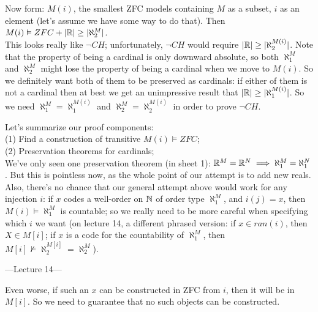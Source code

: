 \documentclass[a4paper]{article}
\begin{document}
Now form: $M(i)$, the smallest ZFC models containing $M$ as a subset, $i$ as an element (let's assume we have some way to do that). Then $M(i) \vDash ZFC+|\mathbb{R}| \geq |\aleph_2^M|$.\\
This looks really like $\neg CH$; unfortunately, $\neg CH$ would require $|\mathbb{R}| \geq |\aleph_2^{M(i)}|$. Note that the property of being a cardinal is only downward absolute, so both $\aleph_1^M$ and $\aleph_2^M$ might lose the property of being a cardinal when we move to $M(i)$. So we definitely want both of them to be preserved as cardinals: if either of them is not a cardinal then at best we get an unimpressive result that $|\mathbb{R}| \geq |\aleph_1^{M(i)}|$. So we need $\aleph_1^M = \aleph_1^{M(i)}$ and $\aleph_2^M = \aleph_2^{M(i)}$ in order to prove $\neg CH$.

Let's summarize our proof components:\\
(1) Find a construction of transitive $M(i) \vDash ZFC$;\\
(2) Preservation theorems for cardinals;\\
We've only seen one preservation theorem (in sheet 1): $\mathbb{R}^M = \mathbb{R}^N \implies \aleph_1^M = \aleph_1^N$. But this is pointless now, as the whole point of our attempt is to add new reals.\\
Also, there's no chance that our general attempt above would work for any injection $i$: if $x$ codes a well-order on $\mathbb{N}$ of order type $\aleph_1^M$, and $i(j) = x$, then $M(i) \vDash \aleph_1^M$ is countable; so we really need to be more careful when specifying which $i$ we want (on lecture 14, a different phrased version: if $x \in ran(i)$, then $X \in M[i]$; if $x$ is a code for the countability of $\aleph_1^M$, then $M[i] \not\vDash \aleph_2^{M[i]} = \aleph_2^M$).

---Lecture 14---

Even worse, if such an $x$ can be constructed in ZFC from $i$, then it will be in $M[i]$. So we need to guarantee that no such objects can be constructed.
\end{document}

